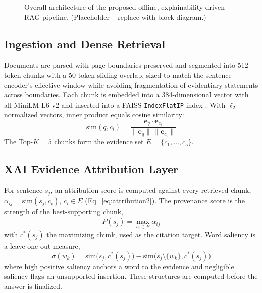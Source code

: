 \documentclass[conference]{IEEEtran}
\begin{document}
\begin{figure}[!t]
\centering
{}
\caption{Overall architecture of the proposed offline, explainability-driven RAG pipeline. (Placeholder -- replace with block diagram.)}
\label{fig:pipeline}
\end{figure}

\subsection{Ingestion and Dense Retrieval}
Documents are parsed with page boundaries preserved and segmented into 512-token chunks with a 50-token sliding overlap, sized to match the sentence encoder's effective window while avoiding fragmentation of evidentiary statements across boundaries. Each chunk is embedded into a 384-dimensional vector with all-MiniLM-L6-v2 \cite{reimers2019sbert} and inserted into a FAISS \texttt{IndexFlatIP} index \cite{johnson2019faiss}. With $\ell_2$-normalized vectors, inner product equals cosine similarity:
\begin{equation}
\mathrm{sim}(q, c_i) = \frac{\mathbf{e}_q \cdot \mathbf{e}_{c_i}}{\lVert \mathbf{e}_q \rVert \, \lVert \mathbf{e}_{c_i} \rVert}
\label{eq:cosine}
\end{equation}
The Top-$K{=}5$ chunks form the evidence set $E = \{c_1,\ldots,c_5\}$.

\subsection{XAI Evidence Attribution Layer}
For sentence $s_j$, an attribution score is computed against every retrieved chunk, $\alpha_{ij} = \mathrm{sim}(s_j, c_i)$, $c_i \in E$ (Eq.~\ref{eq:attribution2}). The provenance score is the strength of the best-supporting chunk,
\begin{equation}
P(s_j) = \max_{c_i \in E} \alpha_{ij}
\label{eq:provenance}
\end{equation}
with $c^{*}(s_j)$ the maximizing chunk, used as the citation target. Word saliency is a leave-one-out measure,
\begin{equation}
\sigma(w_k) = \mathrm{sim}\big(s_j, c^{*}(s_j)\big) - \mathrm{sim}\big(s_j \setminus \{w_k\}, c^{*}(s_j)\big)
\label{eq:saliency}
\end{equation}
where high positive saliency anchors a word to the evidence and negligible saliency flags an unsupported insertion. These structures are computed before the answer is finalized.
\end{document}
